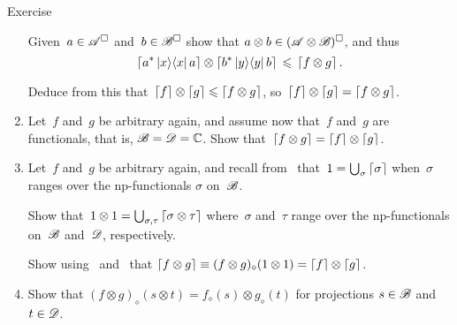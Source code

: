\documentclass[a]{subfiles}
\begin{document}
\begin{parsec}
\begin{point}{Exercise}
\begin{enumerate}
Given~$a\in\mathscr{A}^\square$ and~$b\in\mathscr{B}^\square$
show that $a\otimes b \in (\mathscr{A}\otimes \mathscr{B})^\square$,
and thus
\begin{equation*}
	\left\lceil a^* \left|x\right>\!\left<x\right|a\right\rceil\otimes
\left\lceil b^* \left|y\right>\!\left<y\right|b\right\rceil \,\leqslant\, \left\lceil f\otimes g\right\rceil.
\end{equation*}

Deduce from this that~$\left\lceil f\right\rceil\otimes \left\lceil g\right\rceil\leqslant \left\lceil f\otimes g\right\rceil$,
so~$\left\lceil f\right\rceil\otimes \left\lceil g\right\rceil= \left\lceil f\otimes g\right\rceil$.
\item
Let~$f$ and~$g$ be arbitrary again,
and assume now that~$f$ and~$g$ are functionals,
that is, $\mathscr{B}=\mathscr{D}=\mathbb{C}$.
Show that~$\left\lceil f\otimes g\right\rceil=\left\lceil f\right\rceil\otimes \left\lceil g\right\rceil$.
\item
Let~$f$ and~$g$ be arbitrary again,
and recall
from~
that~$1=\bigcup_{\sigma}\left\lceil\sigma\right\rceil$
when~$\sigma$ ranges over the np-functionals
$\sigma$ on~$\mathscr{B}$.

Show that~$1\otimes 1 
= \bigcup_{\sigma,\tau}\left\lceil\sigma \otimes \tau\right\rceil$
where~$\sigma$ and~$\tau$
range over the np-functionals
on~$\mathscr{B}$ and~$\mathscr{D}$, respectively.

Show using~
and~
that
$\left\lceil f\otimes g\right\rceil \equiv
(f\otimes g)_\diamond(1\otimes 1)
= \left\lceil f\right\rceil\otimes \left\lceil g\right\rceil$.
\item
Show that $(f\otimes g)_\diamond (s\otimes t)
= f_\diamond(s)\otimes g_\diamond(t)$
for projections
$s\in \mathscr{B}$
and~$t\in \mathscr{D}$.
\end{enumerate}
\end{point}
\end{parsec}
\end{document}
